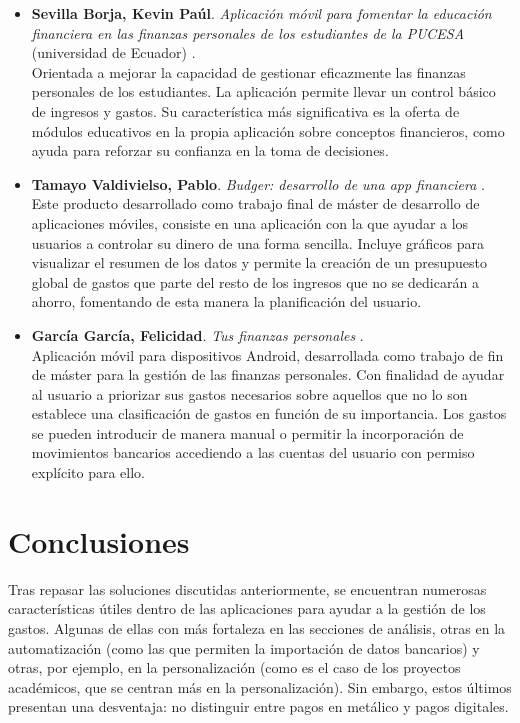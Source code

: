 \begin{itemize}
    \item \textbf{Sevilla Borja, Kevin Paúl}. 
    \textit{Aplicación móvil para fomentar la educación financiera en las finanzas personales 
    de los estudiantes de la PUCESA} (universidad de Ecuador) \cite{sevilla2024aplicacion}. \\
    Orientada a mejorar la capacidad
    de gestionar eficazmente las finanzas personales de los estudiantes. La aplicación 
    permite llevar un control básico de ingresos y gastos. Su característica más significativa 
    es la oferta de módulos educativos en la propia aplicación sobre conceptos financieros, como 
    ayuda para reforzar su confianza en la toma de decisiones.

    \item \textbf{Tamayo Valdivielso, Pablo}. 
    \textit{Budger: desarrollo de una app financiera} \cite{tamayo2022aplicacion}. \\ 
    Este producto desarrollado como 
    trabajo final de máster de desarrollo de aplicaciones móviles, consiste en una aplicación 
    con la que ayudar a los usuarios a controlar su dinero de una forma sencilla. Incluye 
    gráficos para visualizar el resumen de los datos y 
    permite la creación de un presupuesto global de gastos que parte del resto de los ingresos 
    que no se dedicarán a ahorro, fomentando de esta manera la planificación del usuario.

    \item \textbf{García García, Felicidad}. 
    \textit{Tus finanzas personales} \cite{garcia2019aplicacion}. \\  
    Aplicación móvil para dispositivos Android, 
    desarrollada como trabajo de fin de máster para la gestión de las finanzas personales. 
    Con finalidad de ayudar al usuario a priorizar sus gastos necesarios sobre aquellos
    que no lo son establece una clasificación de gastos en función de su importancia. 
    Los gastos se pueden introducir de manera manual o permitir la incorporación de 
    movimientos bancarios accediendo a las cuentas del usuario con permiso explícito para ello.
    
\end{itemize}

\section{Conclusiones}
Tras repasar las soluciones discutidas anteriormente, se encuentran numerosas 
características útiles dentro de las aplicaciones para ayudar a la gestión 
de los gastos. Algunas de ellas con más fortaleza en las secciones de análisis, 
otras en la automatización (como las que permiten la importación de datos bancarios) y  
otras, por ejemplo, en la personalización (como es el caso de los proyectos académicos, que se centran más en la personalización). Sin embargo, estos últimos presentan una desventaja: no distinguir entre pagos en metálico y pagos digitales. 

